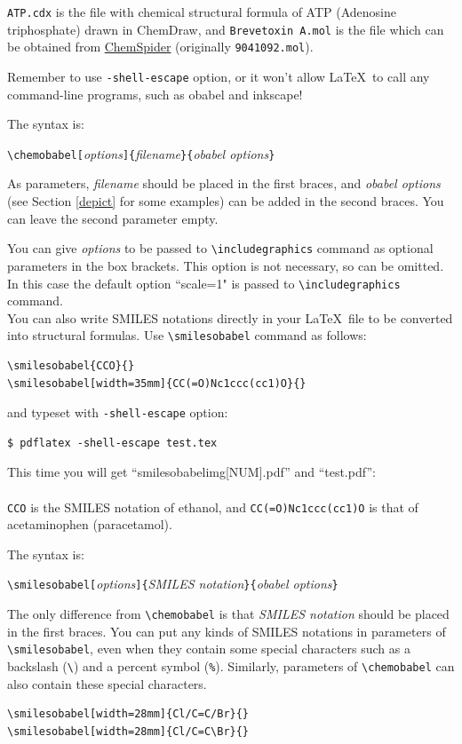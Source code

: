 \documentclass[12pt]{ltjsarticle}
\begin{document}
\verb|ATP.cdx| is the file with chemical structural formula of
ATP (Adenosine triphosphate) drawn in ChemDraw, and
\verb|Brevetoxin A.mol| is the file which can be obtained from
\href{http://www.chemspider.com/}{ChemSpider} (originally \verb|9041092.mol|).

Remember to use \verb|-shell-escape| option, or it won't allow
\LaTeX\ to call any command-line programs, such as obabel and inkscape!

The syntax is:
\begin{center}
\verb|\chemobabel[|\textit{options}\verb|]{|\textit{filename}\verb|}{|\textit{obabel options}\verb|}|
\end{center}
As parameters, \textit{filename} should be placed in the first braces, and
\textit{obabel options} (see Section \ref{depict} for some examples)
can be added in the second braces.
You can leave the second parameter empty.

You can give \textit{options} to be passed to \verb|\includegraphics|
command as optional parameters in the box brackets.
This option is not necessary, so can be omitted. In this case the default
option ``scale=1" is passed to \verb|\includegraphics| command. \\

You can also write SMILES notations directly in your \LaTeX\ file to be
converted into structural formulas.
Use \verb|\smilesobabel| command as follows:
\begin{verbatim}
\smilesobabel{CCO}{}
\smilesobabel[width=35mm]{CC(=O)Nc1ccc(cc1)O}{}
\end{verbatim}
and typeset with \verb|-shell-escape| option:
\begin{verbatim}
$ pdflatex -shell-escape test.tex
\end{verbatim}
This time you will get ``smilesobabelimg[NUM].pdf'' and ``test.pdf'': \\
 \\
\verb|CCO| is the SMILES notation of ethanol, and
\verb|CC(=O)Nc1ccc(cc1)O| is that of acetaminophen (paracetamol).

The syntax is:
\begin{center}
\verb|\smilesobabel[|\textit{options}\verb|]{|\textit{SMILES notation}\verb|}{|\textit{obabel options}\verb|}|
\end{center}
The only difference from \verb|\chemobabel| is that
\textit{SMILES notation} should be placed in the first braces.
You can put any kinds of SMILES notations in parameters of
\verb|\smilesobabel|, even when they contain some special characters
such as a backslash (\verb|\|) and a percent symbol (\verb|%|).
Similarly, parameters of \verb|\chemobabel| can also contain
these special characters.
\begin{verbatim}
\smilesobabel[width=28mm]{Cl/C=C/Br}{}
\smilesobabel[width=28mm]{Cl/C=C\Br}{}
\end{verbatim}
\end{document}
